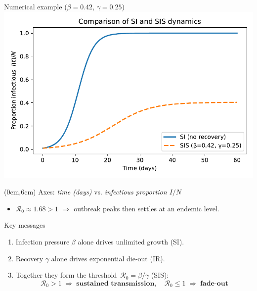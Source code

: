 \documentclass[14pt,aspectratio=169]{beamer}
\newcommand{\RR}{\mathcal{R}_0}
\begin{document}
\begin{frame}{Numerical example ($\beta=0.42$, $\gamma=0.25$)}
  \centering
  \includegraphics{Timeseries.pdf}
  \begin{textblock*}{\textwidth}(0cm,6cm)
    {\scriptsize Axes: \emph{time (days)} vs. \emph{infectious proportion $I/N$}}
  \end{textblock*}
  \vspace{-0.3em}
  \begin{itemize}
    \item $\RR\approx1.68>1$ $\Rightarrow$ outbreak peaks then settles at an endemic level.
  \end{itemize}
\end{frame}

\begin{frame}{Key messages}
  \begin{enumerate}
    \item Infection pressure $\beta$ alone drives unlimited growth (SI).
    \item Recovery $\gamma$ alone drives exponential die‑out (IR).
    \item Together they form the \alert{threshold} $\RR=\beta/\gamma$ (SIS):
      \[
        \RR>1\;\Rightarrow\;\textbf{sustained transmission},\quad
        \RR \leq 1\;\Rightarrow\;\textbf{fade‑out}
      \]
  \end{enumerate}
\end{frame}
\end{document}
